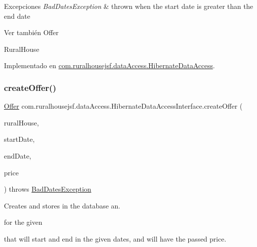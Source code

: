 \begin{DoxyExceptions}{Excepciones}
{\em Bad\+Dates\+Exception} & thrown when the start date is greater than the end date\\
\hline
\end{DoxyExceptions}
\begin{DoxySeeAlso}{Ver también}
Offer 

Rural\+House 
\end{DoxySeeAlso}


Implementado en \mbox{\hyperlink{classcom_1_1ruralhousejsf_1_1data_access_1_1_hibernate_data_access_a332f591a06df13d36814ff215008987b}{com.\+ruralhousejsf.\+data\+Access.\+Hibernate\+Data\+Access}}.

\mbox{\label{interfacecom_1_1ruralhousejsf_1_1data_access_1_1_hibernate_data_access_interface_a31f9cb8a3c8f0b42dee19b03f052cd62}} 
\subsubsection{\texorpdfstring{createOffer()}{createOffer()}\hspace{0.1cm}{\footnotesize\ttfamily [2/2]}}
{\footnotesize\ttfamily \mbox{\hyperlink{classcom_1_1ruralhousejsf_1_1domain_1_1_offer}{Offer}} com.\+ruralhousejsf.\+data\+Access.\+Hibernate\+Data\+Access\+Interface.\+create\+Offer (\begin{DoxyParamCaption}\item[{\mbox{\hyperlink{classcom_1_1ruralhousejsf_1_1domain_1_1_rural_house}{Rural\+House}}}]{rural\+House,  }\item[{Date}]{start\+Date,  }\item[{Date}]{end\+Date,  }\item[{double}]{price }\end{DoxyParamCaption}) throws \mbox{\hyperlink{classcom_1_1ruralhousejsf_1_1exceptions_1_1_bad_dates_exception}{Bad\+Dates\+Exception}}}



Creates and stores in the database an. 


\begin{DoxyCode}{0}
\end{DoxyCode}
 for the given
\begin{DoxyCode}{0}
\end{DoxyCode}
 that will start and end in the given dates, and will have the passed price.


